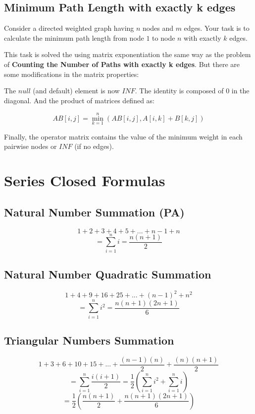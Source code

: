 
\subsection{Minimum Path Length with exactly k edges}

Consider a directed weighted graph having $n$ nodes and $m$ edges.
Your task is to calculate the minimum path length from node $1$ to node $n$ with exactly $k$ edges.

This task is solved the using matrix exponentiation the 
same way as the problem of \textbf{Counting the Number of Paths with exactly k edges}.
But there are some modifications in the matrix properties: 

The $null$ (and default) element is now $INF$. The identity is composed of $0$ in the diagonal.
And the product of matrices defined as:

$$ AB[i, j] = \min^{n}_{k=1} (AB[i, j], A[i,k] + B[k, j]) $$

Finally, the operator matrix contains the value of the minimum weight in each pairwise nodes or $INF$ (if no edges). 

\section{Series Closed Formulas}

\subsection{Natural Number Summation (PA)}

$$ 1 + 2 + 3 + 4 + 5 + ... + n-1 + n $$
$$ = \sum_{i=1}^n i = \frac{ n(n+1) }{ 2 } $$

\subsection{Natural Number Quadratic Summation}

$$ 1 + 4 + 9 + 16 + 25 + ... + (n-1)^2 + n^2 $$
$$ = \sum_{i=1}^n i^2 = \frac{ n(n+1)(2n+1) }{ 6 } $$

\subsection{Triangular Numbers Summation}

$$ 1 + 3 + 6 + 10 + 15 + ... + \frac{(n-1)(n)}{2} + \frac{(n)(n+1)}{2} $$
$$ = \sum_{i=1}^n \frac{i(i+1)}{2} = \frac{1}{2}(\sum_{i=1}^n i^2 + \sum_{i=1}^n i) $$
$$ = \frac{1}{2} ( \frac{ n(n+1) }{ 2 } + \frac{ n(n+1)(2n+1) }{ 6 }) $$

